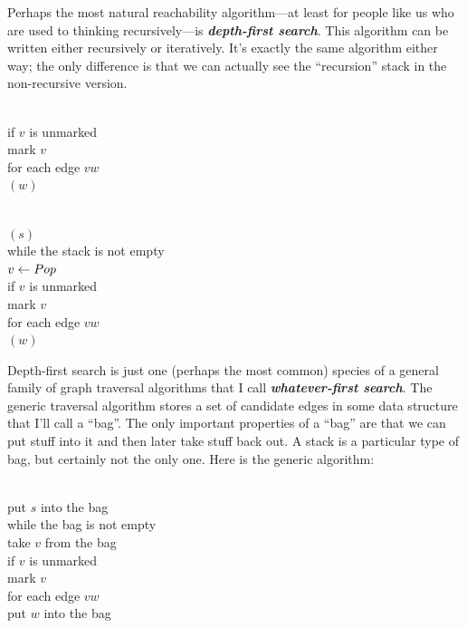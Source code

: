 Perhaps the most natural reachability algorithm---at least for people like us who are used to thinking recursively---is \textbf{\textit{depth-first search}}.
This algorithm can be written either recursively or iteratively.
It’s exactly the same algorithm either way; the only difference is that we can actually see the “recursion” stack in the non-recursive version.

\begin{center}
\begin{minipage}[c]{0.45\linewidth}
\begin{pseudocode}
\\
if $v$ is unmarked\\
\Indent mark $v$\\
\Indent for each edge $vw$\\
\Indent\Indent {}$(w)$
\end{pseudocode}
\end{minipage}\hfill
\begin{minipage}[c]{0.45\linewidth}
\begin{pseudocode}
\\
$(s)$\\
while the stack is not empty\\
\Indent $v \gets Pop$\\
\Indent if $v$ is unmarked\\
\Indent\Indent mark $v$\\
\Indent\Indent for each edge $vw$\\
\Indent\Indent\Indent {}$(w)$
\end{pseudocode}
\end{minipage}
\end{center}

Depth-first search is just one (perhaps the most common) species of a general family of graph traversal algorithms that I call \textbf{\textit{whatever-first search}}.
The generic traversal algorithm stores a set of candidate edges in some data structure that I’ll call a “bag”.
The only important properties of a “bag” are that we can put stuff into it and then later take stuff back out.
A stack is a particular type of bag, but certainly not the only one.
Here is the generic algorithm:

\begin{pseudocode}
\\
put $s$ into the bag\\
while the bag is not empty\\
\Indent take $v$ from the bag\\
\Indent if $v$ is unmarked\\
\Indent\Indent mark $v$\\
\Indent\Indent for each edge $vw$\\
\Indent\Indent\Indent put $w$ into the bag
\end{pseudocode}

